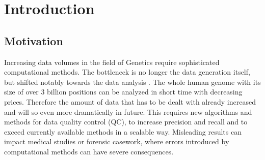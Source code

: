 \chapter{Introduction}
\label{chapterIntro}
\section{Motivation}
Increasing data volumes in the field of Genetics require sophisticated computational methods. The bottleneck is no longer the data generation itself, but shifted notably towards the data analysis \cite{Forer2014}. The whole human genome with its size of over 3 billion positions can be analyzed in short time with decreasing prices. Therefore the amount of data that has to be dealt with already increased and will so even more dramatically in future. This requires new algorithms and methods for data quality control (QC), to  increase precision and recall and to exceed currently available methods in a scalable way. Misleading results can impact medical studies or forensic casework, where errors introduced by computational methods can have severe consequences. 

